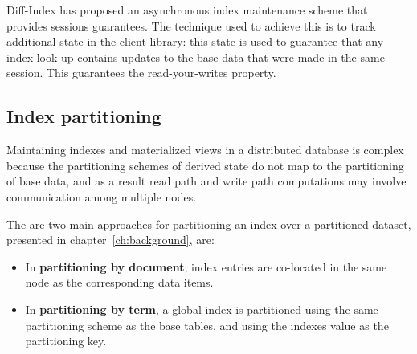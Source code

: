 Diff-Index \cite{tan:diffindex} has proposed an asynchronous index maintenance scheme that provides sessions guarantees.
The technique used to achieve this is to track additional state in the client library:
this state is used to guarantee that any index look-up contains updates to the base data that were made in the same
session.
This guarantees the read-your-writes property.





\subsection{Index partitioning}
\label{sec:index_partitioning}
Maintaining indexes and materialized views in a distributed database is complex because the partitioning schemes of
derived state do not map to the partitioning of base data, and as a result read path and write path computations may
involve communication among multiple nodes.

The are two main approaches for partitioning an index over a partitioned dataset, presented in chapter~\ref{ch:background},
are:
\begin{itemize}

  \item In \textbf{partitioning by document}, index entries are co-located in the same node as the corresponding
  data items.

  \item In \textbf{partitioning by term}, a global index is partitioned using the same partitioning scheme as the base
  tables, and using the indexes value as the partitioning key.

\end{itemize}

